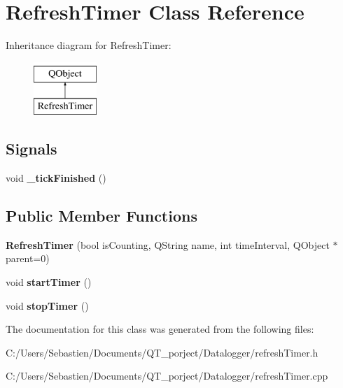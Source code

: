\hypertarget{class_refresh_timer}{}\section{Refresh\+Timer Class Reference}
\label{class_refresh_timer}
Inheritance diagram for Refresh\+Timer\+:\begin{figure}[H]
\begin{center}
\leavevmode
\includegraphics[height=2.000000cm]{class_refresh_timer}
\end{center}
\end{figure}
\subsection*{Signals}
\begin{DoxyCompactItemize}
\item 
\mbox{\label{class_refresh_timer_adead57c7677cc89c54a2c256fbbb0cba}} 
void {\bfseries \+\_\+tick\+Finished} ()
\end{DoxyCompactItemize}
\subsection*{Public Member Functions}
\begin{DoxyCompactItemize}
\item 
\mbox{\label{class_refresh_timer_a122b70f1528d06683f8c09358fcac479}} 
{\bfseries Refresh\+Timer} (bool is\+Counting, Q\+String name, int time\+Interval, Q\+Object $\ast$parent=0)
\item 
\mbox{\label{class_refresh_timer_ab4473c0ed5ef0f7de787825cc7a8ca66}} 
void {\bfseries start\+Timer} ()
\item 
\mbox{\label{class_refresh_timer_a84cab7be9da9bc32782378d346700da1}} 
void {\bfseries stop\+Timer} ()
\end{DoxyCompactItemize}


The documentation for this class was generated from the following files\+:\begin{DoxyCompactItemize}
\item 
C\+:/\+Users/\+Sebastien/\+Documents/\+Q\+T\+\_\+porject/\+Datalogger/refresh\+Timer.\+h\item 
C\+:/\+Users/\+Sebastien/\+Documents/\+Q\+T\+\_\+porject/\+Datalogger/refresh\+Timer.\+cpp\end{DoxyCompactItemize}

